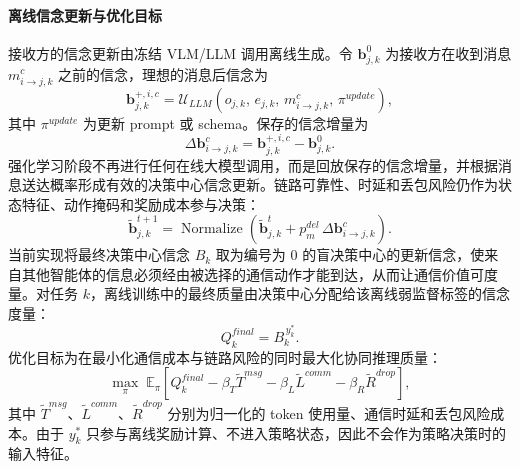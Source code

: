 \paragraph{离线信念更新与优化目标}
接收方的信念更新由冻结 VLM/LLM 调用离线生成。令 $\mathbf{b}_{j,k}^{0}$ 为接收方在收到消息 $m_{i\rightarrow j,k}^{c}$ 之前的信念，理想的消息后信念为
\begin{equation}
\mathbf{b}_{j,k}^{+,i,c}=\mathcal{U}_{LLM}\!\left(o_{j,k},\,e_{j,k},\,m_{i\rightarrow j,k}^{c},\,\pi^{update}\right),
\end{equation}
其中 $\pi^{update}$ 为更新 prompt 或 schema。保存的信念增量为
\begin{equation}
\Delta\mathbf{b}_{i\rightarrow j,k}^{c}=\mathbf{b}_{j,k}^{+,i,c}-\mathbf{b}_{j,k}^{0}.
\end{equation}
强化学习阶段不再进行任何在线大模型调用，而是回放保存的信念增量，并根据消息送达概率形成有效的决策中心信念更新。链路可靠性、时延和丢包风险仍作为状态特征、动作掩码和奖励成本参与决策：
\begin{equation}
\tilde{\mathbf{b}}_{j,k}^{t+1}=\operatorname{Normalize}\!\left(\tilde{\mathbf{b}}_{j,k}^{t}+p_m^{del}\,\Delta\mathbf{b}_{i\rightarrow j,k}^{c}\right).
\end{equation}
当前实现将最终决策中心信念 $B_k$ 取为编号为 0 的盲决策中心的更新信念，使来自其他智能体的信息必须经由被选择的通信动作才能到达，从而让通信价值可度量。对任务 $k$，离线训练中的最终质量由决策中心分配给该离线弱监督标签的信念度量：
\begin{equation}
Q_k^{final}=B_k^{\,y_k^{*}}.
\end{equation}
优化目标为在最小化通信成本与链路风险的同时最大化协同推理质量：
\begin{equation}
\max_{\pi}\;\mathbb{E}_{\pi}\!\left[Q_k^{final}-\beta_T\tilde{T}^{msg}-\beta_L\tilde{L}^{comm}-\beta_R\tilde{R}^{drop}\right],
\end{equation}
其中 $\tilde{T}^{msg}$、$\tilde{L}^{comm}$、$\tilde{R}^{drop}$ 分别为归一化的 token 使用量、通信时延和丢包风险成本。由于 $y_k^{*}$ 只参与离线奖励计算、不进入策略状态，因此不会作为策略决策时的输入特征。
